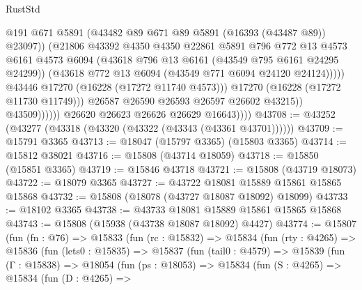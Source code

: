 \begin{lexlean}{RustStd}
\begin{coremodule}
                                      @191
                                      @671
                                      @5891
                                      (@43482 @89 @671 @89 @5891 (@16393 (@43487 @89)) @23097))
                                    (@21806
                                      @43392
                                      @4350
                                      @4350
                                      @22861
                                      @5891
                                      @796
                                      @772
                                      @13
                                      @4573
                                      @6161
                                      @4573
                                      @6094
                                      (@43618 @796 @13 @6161 (@43549 @795 @6161 @24295 @24299))
                                      (@43618 @772 @13 @6094 (@43549 @771 @6094 @24120 @24124)))))
                                @43446
                                @17270
                                (@16228 (@17272 @11740 @4573)))
                              @17270
                              (@16228 (@17272 @11730 @11749)))
                            @26587
                            @26590
                            @26593
                            @26597
                            @26602
                            @43215))
                        @43509))))))
            @26620
            @26623
            @26626
            @26629
            @16643))))
@43708 := @43252 (@43277 (@43318 (@43320 (@43322 (@43343 (@43361 @43701))))))
@43709 := @15791 @3365
@43713 := @18047 (@15797 @3365) (@15803 @3365)
@43714 := @15812 @38021
@43716 := @15808 (@43714 @18059)
@43718 := @15850 (@15851 @3365)
@43719 := @15846 @43718
@43721 := @15808 (@43719 @18073)
@43722 := @18079 @3365
@43727 := @43722 @18081 @15889 @15861 @15865 @15868
@43732 := @15808 (@18078 (@43727 @18087 @18092) @18099)
@43733 := @18102 @3365
@43738 := @43733 @18081 @15889 @15861 @15865 @15868
@43743 := @15808 (@15938 (@43738 @18087 @18092) @4427)
@43774 := @15807
    (fun (fn : @76) =>
    @15833
      (fun (rc : @15832) =>
      @15834
        (fun (rty : @4265) =>
        @15836
          (fun (lets0 : @15835) =>
          @15837
            (fun (tail0 : @4579) =>
            @15839
              (fun (Γ : @15838) =>
              @18054
                (fun (ps : @18053) =>
                @15834
                  (fun (S : @4265) =>
                  @15834
                    (fun (D : @4265) =>

\end{coremodule}
\end{lexlean}
